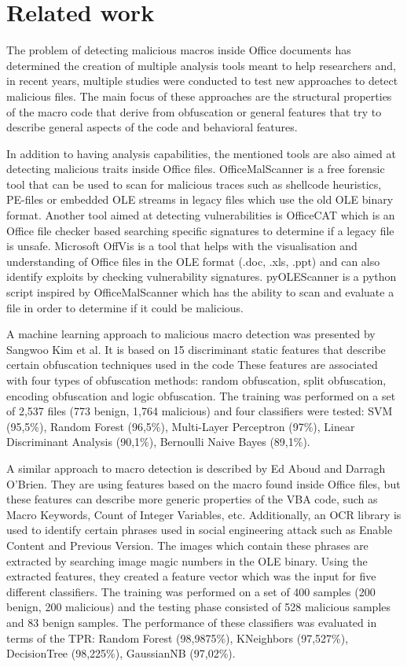 \section{Related work}
The problem of detecting malicious macros inside Office documents has determined the creation of multiple analysis tools meant to help researchers and, in recent years, multiple studies were conducted to test new approaches to detect malicious files. The main focus of these approaches are the structural properties of the macro code that derive from obfuscation or general features that try to describe general aspects of the code and behavioral features. 
\par
In addition to having analysis capabilities, the mentioned tools are also aimed at detecting malicious traits inside Office files. OfficeMalScanner is a free forensic tool that can be used to scan for malicious traces such as shellcode heuristics, PE-files or embedded OLE streams in legacy files which use the old OLE binary format. Another tool aimed at detecting vulnerabilities is OfficeCAT which is an Office file checker based searching specific signatures to determine if a legacy file is unsafe. Microsoft OffVis is a tool that helps with the visualisation and understanding of Office files in the OLE format (.doc, .xls, .ppt) and can also identify exploits by checking vulnerability signatures. pyOLEScanner is a python script inspired by OfficeMalScanner which has the ability to scan and evaluate a file in order to determine if it could be malicious.
\par
A machine learning approach to malicious macro detection was presented by Sangwoo Kim et al. It is based on 15 discriminant static features that describe certain obfuscation techniques used in the code  These features are associated with four types of obfuscation methods: random obfuscation, split obfuscation, encoding obfuscation and logic obfuscation. The training was performed on a set of 2,537 files (773 benign, 1,764 malicious) and four classifiers were tested: SVM (95,5\%), Random Forest (96,5\%), Multi-Layer Perceptron (97\%), Linear Discriminant Analysis (90,1\%), Bernoulli Naive Bayes (89,1\%). 
\par
A similar approach to macro detection is described by Ed Aboud and Darragh O’Brien. They are using features based on the macro found inside Office files, but these features can describe more generic properties of the VBA code, such as Macro Keywords, Count of Integer Variables, etc. Additionally, an OCR library is used to identify certain phrases used in social engineering attack such as Enable Content and Previous Version. The images which contain these phrases are extracted by searching image magic numbers in the OLE binary. Using the extracted features, they created a feature vector which was the input for five different classifiers. The training was performed on a set of 400 samples (200 benign, 200 malicious) and the testing phase consisted of 528 malicious samples and 83 benign samples. The performance of these classifiers was evaluated in terms of the TPR: Random Forest (98,9875\%), KNeighbors (97,527\%), DecisionTree (98,225\%), GaussianNB (97,02\%).
